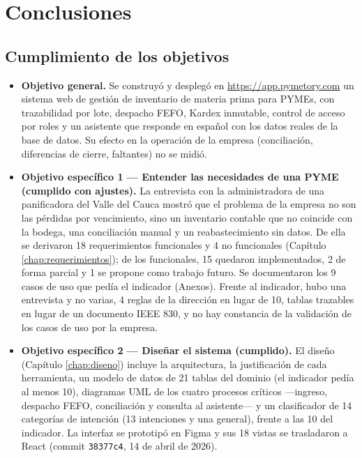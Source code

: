
\section{Conclusiones}

\subsection{Cumplimiento de los objetivos}

\begin{itemize}
    \item \textbf{Objetivo general.} Se construyó y desplegó en \url{https://app.pymetory.com} un sistema web de gestión de inventario de materia prima para PYMEs, con trazabilidad por lote, despacho FEFO, Kardex inmutable, control de acceso por roles y un asistente que responde en español con los datos reales de la base de datos. Su efecto en la operación de la empresa (conciliación, diferencias de cierre, faltantes) no se midió.

    \item \textbf{Objetivo específico 1 --- Entender las necesidades de una PYME (cumplido con ajustes).} La entrevista con la administradora de una panificadora del Valle del Cauca mostró que el problema de la empresa no son las pérdidas por vencimiento, sino un inventario contable que no coincide con la bodega, una conciliación manual y un reabastecimiento sin datos. De ella se derivaron 18 requerimientos funcionales y 4 no funcionales (Capítulo \ref{chap:requerimientos}); de los funcionales, 15 quedaron implementados, 2 de forma parcial y 1 se propone como trabajo futuro. Se documentaron los 9 casos de uso que pedía el indicador (Anexos). Frente al indicador, hubo una entrevista y no varias, 4 reglas de la dirección en lugar de 10, tablas trazables en lugar de un documento IEEE 830, y no hay constancia de la validación de los casos de uso por la empresa.

    \item \textbf{Objetivo específico 2 --- Diseñar el sistema (cumplido).} El diseño (Capítulo \ref{chap:diseno}) incluye la arquitectura, la justificación de cada herramienta, un modelo de datos de 21 tablas del dominio (el indicador pedía al menos 10), diagramas UML de los cuatro procesos críticos ---ingreso, despacho FEFO, conciliación y consulta al asistente--- y un clasificador de 14 categorías de intención (13 intenciones y una general), frente a las 10 del indicador. La interfaz se prototipó en Figma y sus 18 vistas se trasladaron a React (commit \texttt{38377c4}, 14 de abril de 2026).


\end{itemize}
